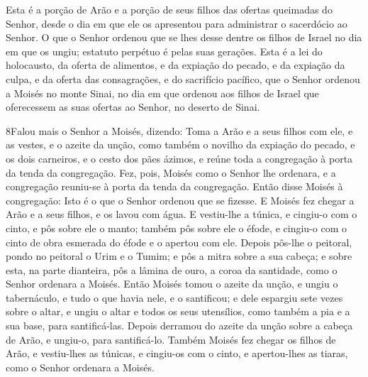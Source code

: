 Esta é a porção de Arão e a porção de seus filhos das ofertas
queimadas do Senhor, desde o dia em que ele os apresentou para
administrar o sacerdócio ao Senhor. O que o Senhor ordenou
que se lhes desse dentre os filhos de Israel no dia em que os ungiu;
estatuto perpétuo é pelas suas gerações. Esta é a lei do
holocausto, da oferta de alimentos, e da expiação do pecado, e da
expiação da culpa, e da oferta das consagrações, e do sacrifício
pacífico, que o Senhor ordenou a Moisés no monte Sinai, no
dia em que ordenou aos filhos de Israel que oferecessem as suas
ofertas ao Senhor, no deserto de Sinai.

\medskip

\lettrine{8} Falou mais o Senhor a Moisés, dizendo: Toma a
Arão e a seus filhos com ele, e as vestes, e o azeite da unção, como
também o novilho da expiação do pecado, e os dois carneiros, e o
cesto dos pães ázimos, e reúne toda a congregação à porta da
tenda da congregação. Fez, pois, Moisés como o Senhor lhe
ordenara, e a congregação reuniu-se à porta da tenda da congregação.
Então disse Moisés à congregação: Isto é o que o Senhor ordenou
que se fizesse. E Moisés fez chegar a Arão e a seus filhos, e os
lavou com água. E vestiu-lhe a túnica, e cingiu-o com o cinto, e
pôs sobre ele o manto; também pôs sobre ele o éfode, e cingiu-o com
o cinto de obra esmerada do éfode e o apertou com ele. Depois
pôs-lhe o peitoral, pondo no peitoral o Urim e o Tumim; e pôs a
mitra sobre a sua cabeça; e sobre esta, na parte dianteira, pôs a
lâmina de ouro, a coroa da santidade, como o Senhor ordenara a
Moisés. Então Moisés tomou o azeite da unção, e ungiu o
tabernáculo, e tudo o que havia nele, e o santificou; e dele
espargiu sete vezes sobre o altar, e ungiu o altar e todos os seus
utensílios, como também a pia e a sua base, para santificá-las.
Depois derramou do azeite da unção sobre a cabeça de Arão, e
ungiu-o, para santificá-lo. Também Moisés fez chegar os
filhos de Arão, e vestiu-lhes as túnicas, e cingiu-os com o cinto, e
apertou-lhes as tiaras, como o Senhor ordenara a Moisés.

